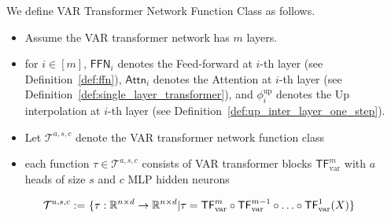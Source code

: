 \begin{definition}\label{def:var_function_class} We define VAR Transformer Network Function Class as follows.
    \begin{itemize}
        \item Assume the VAR transformer network has $m$ layers.
        \item for $i \in [m]$, $\mathsf{FFN}_i$ denotes the Feed-forward at $i$-th layer (see Definition~\ref{def:ffn}), $\mathsf{Attn}_i$ denotes the Attention at $i$-th layer (see Definition~\ref{def:single_layer_transformer}), and $\phi^{\mathrm{up}}_i$ denotes the Up interpolation at $i$-th layer (see Definition~\ref{def:up_inter_layer_one_step}).
        \item Let $\mathcal{T}^{a,s,c}$ denote the VAR transformer network function class
        \item each function $\tau \in \mathcal{T}^{a,s,c}$ consists of VAR transformer blocks $\mathsf{TF}_{\mathrm{var}}^m$ with $a$ heads of size $s$ and $c$ MLP hidden neurons
    \end{itemize}
    \begin{align*}
        \mathcal{T}^{a,s,c} := 
        & ~ \{ \tau: \mathbb{R}^{n\times d} \to \mathbb{R}^{n\times d} | \tau = \mathsf{TF}_{\mathrm{var}}^m \circ \mathsf{TF}_{\mathrm{var}}^{m-1} \circ \hdots \circ \mathsf{TF}_{\mathrm{var}}^1 (X)
        \} 
    \end{align*}
\end{definition}